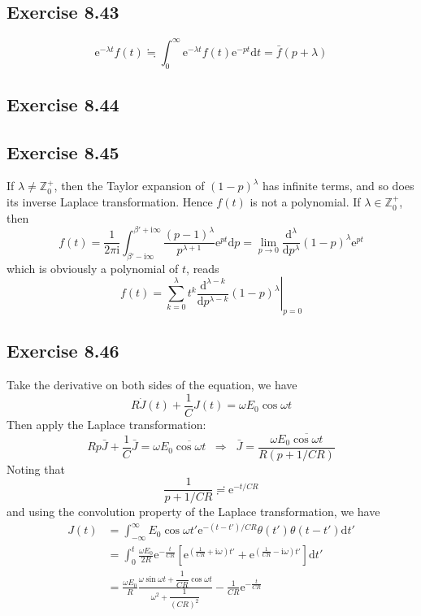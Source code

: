 \documentclass[]{ctexart}
\begin{document}
		\subsection{Exercise 8.43}
		\begin{equation*}
		\mathrm{e}^{-\lambda t}f(t)\fallingdotseq\int_0^\infty\mathrm{e}^{-\lambda t}f(t)\mathrm{e}^{-pt}\mathrm{d}t=\bar f(p+\lambda)
		\end{equation*}
		
		\subsection{Exercise 8.44}
		\subsection{Exercise 8.45}
		If $\lambda\ne\mathbb Z^+_0$, then the Taylor expansion of $(1-p)^\lambda$ has infinite terms, and so does its inverse Laplace transformation. 
		Hence $f(t)$ is not a polynomial. If $\lambda\in\mathbb Z^+_0$, then 
		\begin{equation*}
		f(t)=\frac{1}{2\pi\mathrm{i}}\int_{\beta'-\mathrm{i}\infty}^{\beta'+\mathrm{i}\infty}\frac{(p-1)^\lambda}{p^{\lambda+1}}\mathrm{e}^{pt}\mathrm{d}p=\lim_{p\to 0}\frac{\mathrm{d}^\lambda}{\mathrm{d}p^\lambda}(1-p)^\lambda\mathrm{e}^{pt}
		\end{equation*}
		which is obviously a polynomial of $t$, reads 
		\begin{equation*}
		f(t)=\sum_{k=0}^\lambda t^{k}\left.\frac{\mathrm{d}^{\lambda-k}}{\mathrm{d}p^{\lambda-k}}(1-p)^\lambda\right|_{p=0}
		\end{equation*}
		\subsection{Exercise 8.46}
		Take the derivative on both sides of the equation, we have 
		\begin{equation*}
		R\dot J(t)+\frac{1}{C}J(t)=\omega E_0\cos\omega t
		\end{equation*}
		Then apply the Laplace transformation: 
		\begin{equation*}
		Rp\bar J+\frac{1}{C}\bar J=\omega E_0\overline{\cos\omega t}\;\;\Rightarrow\;\;\bar J=\frac{\omega E_0\overline{\cos\omega t}}{R(p+1/CR)}
		\end{equation*}
		Noting that 
		\begin{equation*}
		\frac{1}{p+1/CR}\risingdotseq\mathrm{e}^{-t/CR}
		\end{equation*}
		and using the convolution property of the Laplace transformation, we have 
		\begin{align*}
		J(t)&=\int_{-\infty}^\infty E_0\cos\omega t'\mathrm{e}^{-(t-t')/CR}\theta(t')\theta(t-t')\mathrm{d}t'\\
		&=\int_0^t\frac{\omega E_0}{2R}\mathrm{e}^{-\frac{t}{CR}}\left[\mathrm{e}^{\left(\frac{1}{CR}+\mathrm{i}\omega\right)t'}+\mathrm{e}^{\left(\frac{1}{CR}-\mathrm{i}\omega\right)t'}\right]\mathrm{d}t'\\
		&=\frac{\omega E_0}{R}\frac{\omega\sin\omega t+\dfrac{1}{CR}\cos\omega t}{\omega^2+\dfrac{1}{(CR)^2}}-\frac{1}{CR}\mathrm{e}^{-\frac{t}{CR}}
		\end{align*}
		
\end{document}
